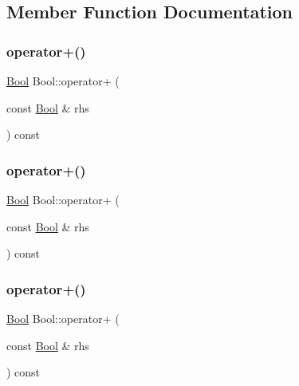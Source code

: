 \subsection{Member Function Documentation}
\mbox{\label{struct_bool_a6f4ecdec19082e896cffce66e6b6e7cc}} 
\subsubsection{\texorpdfstring{operator+()}{operator+()}\hspace{0.1cm}{\footnotesize\ttfamily [1/3]}}
{\footnotesize\ttfamily \mbox{\hyperlink{struct_bool}{Bool}} Bool\+::operator+ (\begin{DoxyParamCaption}\item[{const \mbox{\hyperlink{struct_bool}{Bool}} \&}]{rhs }\end{DoxyParamCaption}) const\hspace{0.3cm}{\ttfamily [inline]}}

\mbox{\label{struct_bool_a6f4ecdec19082e896cffce66e6b6e7cc}} 
\subsubsection{\texorpdfstring{operator+()}{operator+()}\hspace{0.1cm}{\footnotesize\ttfamily [2/3]}}
{\footnotesize\ttfamily \mbox{\hyperlink{struct_bool}{Bool}} Bool\+::operator+ (\begin{DoxyParamCaption}\item[{const \mbox{\hyperlink{struct_bool}{Bool}} \&}]{rhs }\end{DoxyParamCaption}) const\hspace{0.3cm}{\ttfamily [inline]}}

\mbox{\label{struct_bool_a6f4ecdec19082e896cffce66e6b6e7cc}} 
\subsubsection{\texorpdfstring{operator+()}{operator+()}\hspace{0.1cm}{\footnotesize\ttfamily [3/3]}}
{\footnotesize\ttfamily \mbox{\hyperlink{struct_bool}{Bool}} Bool\+::operator+ (\begin{DoxyParamCaption}\item[{const \mbox{\hyperlink{struct_bool}{Bool}} \&}]{rhs }\end{DoxyParamCaption}) const\hspace{0.3cm}{\ttfamily [inline]}}

